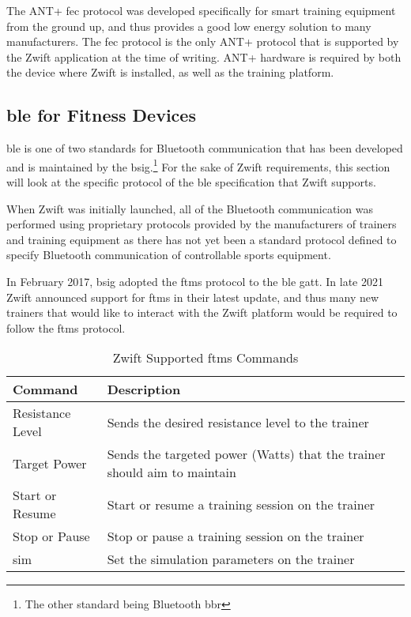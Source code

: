 The ANT+ \ac{fec} protocol was developed specifically for smart training equipment from the ground up, and thus provides a good low energy solution to many manufacturers. The \ac{fec} protocol is the only ANT+ protocol that is supported by the Zwift application at the time of writing. ANT+ hardware is required by both the device where Zwift is installed, as well as the training platform.

\subsection{\acf{ble} for Fitness Devices}
\ac{ble} is one of two standards for Bluetooth communication that has been developed and is maintained by the \ac{bsig}.\footnote{The other standard being Bluetooth \ac{bbr}} For the sake of Zwift requirements, this section will look at the specific protocol of the \ac{ble} specification that Zwift supports.

When Zwift was initially launched, all of the Bluetooth communication was performed using proprietary protocols provided by the manufacturers of trainers and training equipment as there has not yet been a standard protocol defined to specify Bluetooth communication of controllable sports equipment.

In February 2017, \ac{bsig} adopted the \ac{ftms} protocol to the \ac{ble} \ac{gatt}. In late 2021 Zwift announced support for \ac{ftms} in their latest update, and thus many new trainers that would like to interact with the Zwift platform would be required to follow the \ac{ftms} protocol. \citep[2021]{Jeremy:2021}

\begin{table}[H]
	\renewcommand{\arraystretch}{\tablestretch}
	\centering
	\caption{Zwift Supported \ac{ftms} Commands}
	\begin{tabularx}{\textwidth}{ >{\raggedright}p{4cm} X}
		\toprule
		Command          & Description                                                              \\
		\midrule
		Resistance Level & Sends the desired resistance level to the trainer                        \\
		Target Power     & Sends the targeted power (Watts) that the trainer should aim to maintain \\
		Start or Resume  & Start or resume a training session on the trainer                      \\
		Stop or Pause    & Stop or pause a training session on the trainer                          \\
		\ac{sim}         & Set the simulation parameters on the trainer                             \\
		\bottomrule
	\end{tabularx}
	\label{tab:blreq}
\end{table}

